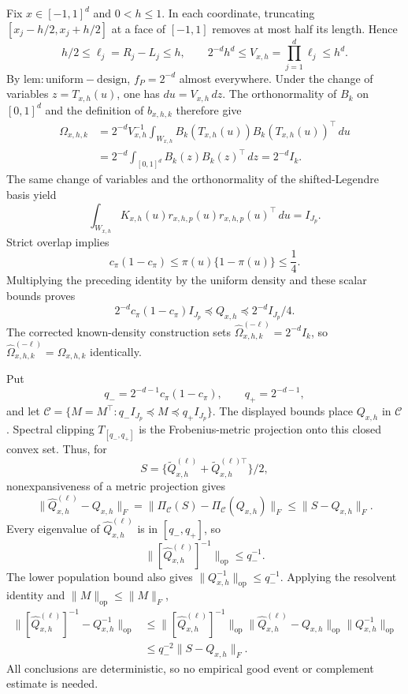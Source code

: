 Fix \(x\in[-1,1]^d\) and \(0<h\le1\). In each coordinate, truncating \([x_j-h/2,x_j+h/2]\) at a face of \([-1,1]\) removes at most half its length. Hence
\[
 h/2\le \ell_j=R_j-L_j\le h,
 \qquad
 2^{-d}h^d\le V_{x,h}=\prod_{j=1}^d\ell_j\le h^d.
\]
By \(\mathrm{lem:uniform-design}\), \(f_P=2^{-d}\) almost everywhere. Under the change of variables \(z=T_{x,h}(u)\), one has \(du=V_{x,h}\,dz\). The orthonormality of \(B_k\) on \([0,1]^d\) and the definition of \(b_{x,h,k}\) therefore give
\[
\begin{aligned}
 \Omega_{x,h,k}
 &=2^{-d}V_{x,h}^{-1}\int_{W_{x,h}}
 B_k(T_{x,h}(u))B_k(T_{x,h}(u))^\top\,du\\
 &=2^{-d}\int_{[0,1]^d}B_k(z)B_k(z)^\top\,dz
 =2^{-d}I_k.
\end{aligned}
\]
The same change of variables and the orthonormality of the shifted-Legendre basis yield
\[
 \int_{W_{x,h}}K_{x,h}(u)r_{x,h,p}(u)r_{x,h,p}(u)^\top\,du=I_{J_p}.
\]
Strict overlap implies
\[
 c_\pi(1-c_\pi)\le \pi(u)\{1-\pi(u)\}\le\frac14.
\]
Multiplying the preceding identity by the uniform density and these scalar bounds proves
\[
 2^{-d}c_\pi(1-c_\pi)I_{J_p}
 \preceq Q_{x,h}
 \preceq 2^{-d}I_{J_p}/4.
\]
The corrected known-density construction sets \(\widehat\Omega^{(-\ell)}_{x,h,k}=2^{-d}I_k\), so \(\widehat\Omega^{(-\ell)}_{x,h,k}=\Omega_{x,h,k}\) identically.

Put
\[
 q_-=2^{-d-1}c_\pi(1-c_\pi),
 \qquad q_+=2^{-d-1},
\]
and let \(\mathcal C=\{M=M^\top:q_-I_{J_p}\preceq M\preceq q_+I_{J_p}\}\). The displayed bounds place \(Q_{x,h}\) in \(\mathcal C\). Spectral clipping \(T_{[q_-,q_+]}\) is the Frobenius-metric projection onto this closed convex set. Thus, for
\[
 S=\{\widetilde Q^{(\ell)}_{x,h}+\widetilde Q^{(\ell)\top}_{x,h}\}/2,
\]
nonexpansiveness of a metric projection gives
\[
 \|\widehat Q^{(\ell)}_{x,h}-Q_{x,h}\|_F
 =\|\Pi_{\mathcal C}(S)-\Pi_{\mathcal C}(Q_{x,h})\|_F
 \le \|S-Q_{x,h}\|_F.
\]
Every eigenvalue of \(\widehat Q^{(\ell)}_{x,h}\) is in \([q_-,q_+]\), so
\[
 \|[\widehat Q^{(\ell)}_{x,h}]^{-1}\|_{\mathrm{op}}\le q_-^{-1}.
\]
The lower population bound also gives \(\|Q_{x,h}^{-1}\|_{\mathrm{op}}\le q_-^{-1}\). Applying the resolvent identity and \(\|M\|_{\mathrm{op}}\le\|M\|_F\),
\[
\begin{aligned}
 \|[\widehat Q^{(\ell)}_{x,h}]^{-1}-Q_{x,h}^{-1}\|_{\mathrm{op}}
 &\le \|[\widehat Q^{(\ell)}_{x,h}]^{-1}\|_{\mathrm{op}}
 \|\widehat Q^{(\ell)}_{x,h}-Q_{x,h}\|_{\mathrm{op}}
 \|Q_{x,h}^{-1}\|_{\mathrm{op}}\\
 &\le q_-^{-2}\|S-Q_{x,h}\|_F.
\end{aligned}
\]
All conclusions are deterministic, so no empirical good event or complement estimate is needed.